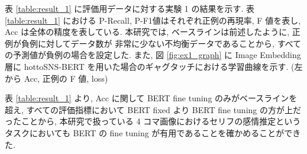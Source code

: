 表 \ref{table:result_1} に評価用データに対する実験 1 の結果を示す. 表 \ref{table:result_1} における P-Recall, P-F1値はそれぞれ正例の再現率, F 値を表し, Acc は全体の精度を表している.
本研究では, ベースラインは前述したように, 正例が負例に対してデータ数が
非常に少ない不均衡データであることから, すべての予測値が負例の場合を設定した.
また, 図 \ref{fig:ex1_graph} に Image Embedding 層に hottoSNS-BERT を用いた場合のギャグタッチにおける学習曲線を示す. (左から Acc, 正例の F 値, loss)

表 \ref{table:result_1} より, Acc に関して BERT fine tuning のみがベースラインを超え, すべての評価指標において BERT fixed より BERT fine tuning の方が上だったことから, 本研究で扱っている 4 コマ画像におけるセリフの感情推定というタスクにおいても BERT の fine tuning が有用であることを確かめることができた.

\begin{table}[!hb]
\begin{center}
\caption{評価用データに対する実験 1 の結果}
\label{table:result_1}
\end{center}
\end{table}

